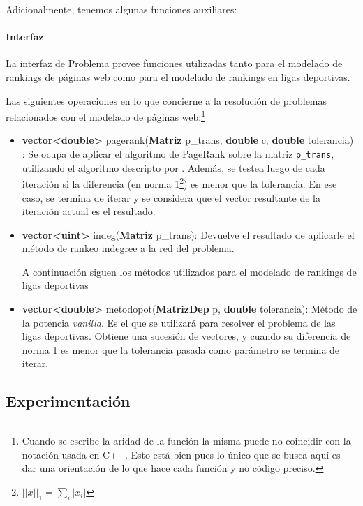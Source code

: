 Adicionalmente, tenemos algunas funciones auxiliares: 

\paragraph{Interfaz}

La interfaz de Problema provee funciones utilizadas tanto para el modelado de rankings de páginas web como para el modelado de rankings en ligas deportivas.

Las siguientes operaciones en lo que concierne a la resolución de problemas relacionados con el modelado de páginas web:\footnote{Cuando se escribe la aridad de la función la misma puede no coincidir con la notación usada en C++. Esto está bien pues lo único que se busca aquí es dar una orientación de lo que hace cada función y no código preciso.}

\begin{itemize}
    \item  \textbf{vector<double>} pagerank(\textbf{Matriz} p\_trans, \textbf{double} c, \textbf{double} tolerancia) :
        Se ocupa de aplicar el algoritmo de PageRank sobre la matriz \texttt{p\_trans}, utilizando el algoritmo descripto por \cite[Algoritmo 1]{Kamvar2003}. Además, se testea luego de cada iteración si la diferencia (en norma 1\footnote{$||x||_1 = \sum_i |x_i|$}) es menor que la tolerancia. En ese caso, se termina de iterar y se considera que el vector resultante de la iteración actual es el resultado. 
          
    \item \textbf{vector<uint>} indeg(\textbf{Matriz} p\_trans):  Devuelve el resultado de aplicarle el m\'etodo de rankeo indegree a la red del problema.

A continuación siguen los m\'etodos utilizados para el modelado de rankings de ligas deportivas

  \item \textbf{vector<double>} metodopot(\textbf{MatrizDep} p, \textbf{double} tolerancia):
      M\'etodo de la potencia \emph{vanilla}. Es el que se utilizará para resolver el problema de las ligas deportivas. Obtiene una sucesión de vectores, y cuando su diferencia de norma 1 es menor que la tolerancia pasada como parámetro se termina de iterar.   

\end{itemize}

\subsection{Experimentación}

